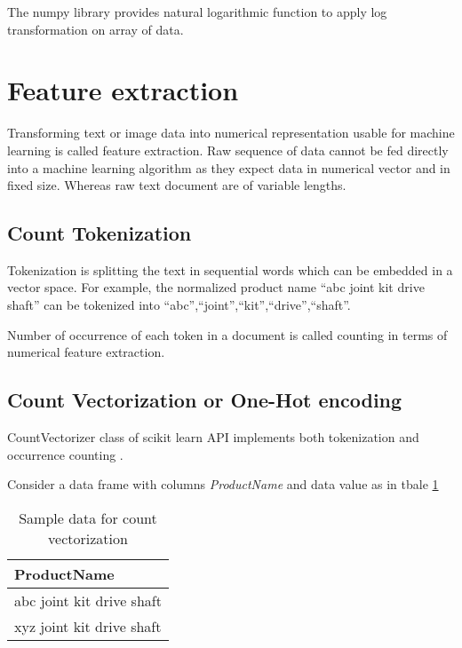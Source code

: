The numpy library provides natural logarithmic function to apply log transformation on array of data.


\section{Feature extraction} \label{ch:feature-extraction}

Transforming text or image data into numerical representation usable for machine learning is called feature extraction. Raw sequence of data cannot be fed directly into a machine learning algorithm as they expect data in numerical vector and in fixed size. Whereas raw text document are of variable lengths. 

\subsection{Count Tokenization}

Tokenization is splitting the text in sequential words which can be embedded in a vector space.
For example, the normalized product name ``abc joint kit drive shaft'' can be tokenized into  ``abc'',``joint'',``kit'',``drive'',``shaft''. 

Number of occurrence of each token in a document is called counting in terms of numerical feature extraction.

\subsection{Count Vectorization or One-Hot encoding} \label{ch_countvector}


CountVectorizer class of scikit learn API implements both tokenization and occurrence counting \parencite{sklearn_api}. 

Consider a data frame with columns \textit{ProductName} and data value as in tbale \ref{table:count_vectorization}

\begin{table}[h]
    \centering
    \caption{Sample data for count vectorization}
    \label{table:count_vectorization}
    \begin{tabular}{ l }
          \toprule
          
          \textbf{ProductName}\\
          \midrule
          abc joint kit drive shaft\\
          xyz joint kit drive shaft\\
         
          \bottomrule
          \end{tabular}
\end{table}


